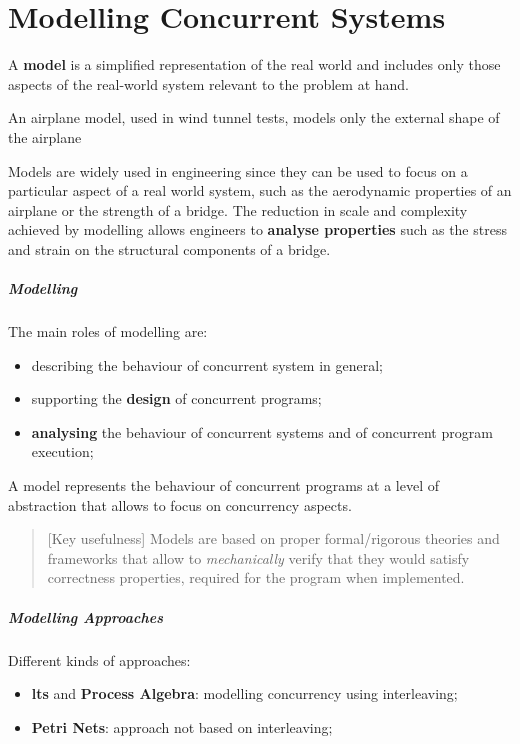 \chapter{Modelling Concurrent Systems}\label{chap:md_modelling_concurrent_systems} %
A \textbf{model} is a simplified representation of the real world and includes only those aspects of the real-world system relevant to the problem at hand.
\begin{example}{}{}
    An airplane model, used in wind tunnel tests, models only the external shape of the airplane
\end{example}
Models are widely used in engineering since they can be used to focus on a particular aspect of a real world system, such as the aerodynamic properties of an airplane or the strength of a bridge.
The reduction in scale and complexity achieved by modelling allows engineers to \textbf{analyse properties} such as the stress and strain on the structural components of a bridge.
\paragraph{Modelling}\label{par:md_modelling} %
The main roles of modelling are:
\begin{itemize}
    \item describing the behaviour of concurrent system in general;
    \item supporting the \textbf{design} of concurrent programs;
    \item \textbf{analysing} the behaviour of concurrent systems and of concurrent program execution;
\end{itemize}
A model represents the behaviour of concurrent programs at a level of abstraction that allows to focus on concurrency aspects.
\begin{quote}[Key usefulness]
    Models are based on proper formal/rigorous theories and frameworks that allow to \textit{mechanically} verify that they would satisfy correctness properties, required for the program when implemented.
\end{quote}
%
\paragraph{Modelling Approaches}\label{par:md_modelling_approaches} %
Different kinds of approaches:
\begin{itemize}
    \item \textbf{\ac{lts}} and \textbf{Process Algebra}: modelling concurrency using interleaving;
    \item \textbf{Petri Nets}: approach not based on interleaving;
\end{itemize}
